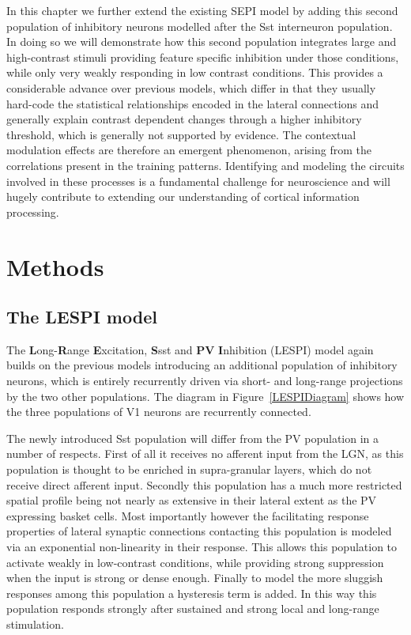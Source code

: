 In this chapter we further extend the existing SEPI model by adding
this second population of inhibitory neurons modelled after the Sst
interneuron population. In doing so we will demonstrate how this
second population integrates large and high-contrast stimuli providing
feature specific inhibition under those conditions, while only very
weakly responding in low contrast conditions. This provides a
considerable advance over previous models, which differ in that they
usually hard-code the statistical relationships encoded in the lateral
connections and generally explain contrast dependent changes through a
higher inhibitory threshold, which is generally not supported by
evidence. The contextual modulation effects are therefore an emergent
phenomenon, arising from the correlations present in the training
patterns. Identifying and modeling the circuits involved in these
processes is a fundamental challenge for neuroscience and will hugely
contribute to extending our understanding of cortical information
processing.

\section{Methods}

\subsection{The LESPI model}

The \textbf{L}ong-\textbf{R}ange \textbf{E}xcitation, \textbf{S}sst
and \textbf{PV} \textbf{I}nhibition (LESPI) model again builds on the
previous models introducing an additional population of inhibitory
neurons, which is entirely recurrently driven via short- and
long-range projections by the two other populations. The diagram in
Figure~\ref{LESPIDiagram} shows how the three populations of V1
neurons are recurrently connected.

The newly introduced Sst population will differ from the PV population
in a number of respects. First of all it receives no afferent input
from the LGN, as this population is thought to be enriched in
supra-granular layers, which do not receive direct afferent
input. Secondly this population has a much more restricted spatial
profile being not nearly as extensive in their lateral extent as the
PV expressing basket cells. Most importantly however the facilitating
response properties of lateral synaptic connections contacting this
population is modeled via an exponential non-linearity in their
response. This allows this population to activate weakly in
low-contrast conditions, while providing strong suppression when the
input is strong or dense enough. Finally to model the more sluggish
responses among this population a hysteresis term is added. In this
way this population responds strongly after sustained and strong local
and long-range stimulation.

